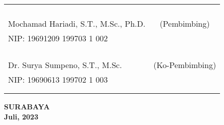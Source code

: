     \noindent
    \begin{tabularx}{\textwidth}{X c}
      &  \\
      &  \\
      &  \\
      &  \\
      Mochamad Hariadi, S.T., M.Sc., Ph.D.        & (Pembimbing) \\
      NIP: 19691209 199703 1 002        & \\
      &  \\
      &  \\ 
      &  \\
      &  \\
      Dr. Surya Sumpeno, S.T., M.Sc.     & (Ko-Pembimbing) \\
      NIP: 19690613 199702 1 003       & \\
      &  \\
      &  \\
    \end{tabularx}
  \endgroup

  \vspace{4ex}

  \begin{center}
    \textbf{SURABAYA} \\
    \textbf{Juli, 2023}
  \end{center}
\endgroup
